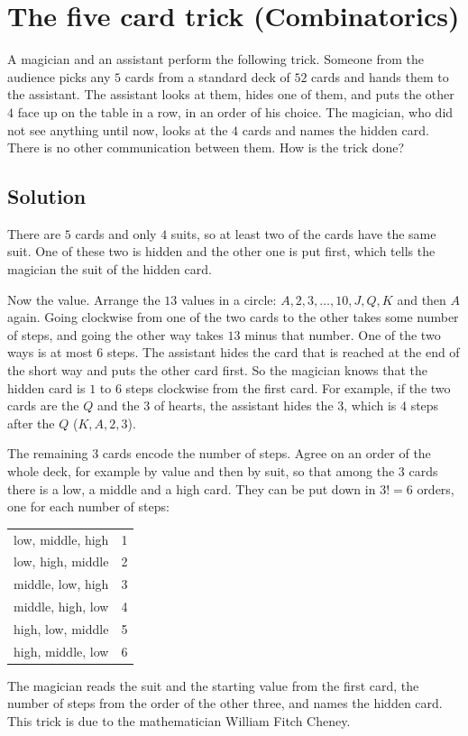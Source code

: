 \section {The five card trick (Combinatorics)}

A magician and an assistant perform the following trick. Someone from the audience picks any $5$ cards from a standard deck of $52$ cards
and hands them to the assistant. The assistant looks at them, hides one of them, and puts the other $4$ face up on the table in a row, in an order of his choice.
The magician, who did not see anything until now, looks at the $4$ cards and names the hidden card.
There is no other communication between them. How is the trick done?

\subsection{Solution}

There are $5$ cards and only $4$ suits, so at least two of the cards have the same suit.
One of these two is hidden and the other one is put first, which tells the magician the suit of the hidden card.

Now the value. Arrange the $13$ values in a circle: $A, 2, 3, \ldots, 10, J, Q, K$ and then $A$ again.
Going clockwise from one of the two cards to the other takes some number of steps, and going the other way takes $13$ minus that number.
One of the two ways is at most $6$ steps. The assistant hides the card that is reached at the end of the short way and puts the other card first.
So the magician knows that the hidden card is $1$ to $6$ steps clockwise from the first card.
For example, if the two cards are the $Q$ and the $3$ of hearts, the assistant hides the $3$, which is $4$ steps after the $Q$ ($K, A, 2, 3$).

The remaining $3$ cards encode the number of steps. Agree on an order of the whole deck, for example by value and then by suit,
so that among the $3$ cards there is a low, a middle and a high card. They can be put down in $3! = 6$ orders, one for each number of steps:
\begin{center}
\begin{tabular}{c c}
low, middle, high & 1 \\
low, high, middle & 2 \\
middle, low, high & 3 \\
middle, high, low & 4 \\
high, low, middle & 5 \\
high, middle, low & 6 \\
\end{tabular}
\end{center}
The magician reads the suit and the starting value from the first card, the number of steps from the order of the other three, and names the hidden card.
This trick is due to the mathematician William Fitch Cheney.
